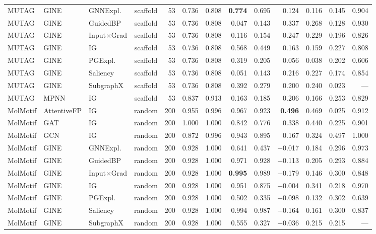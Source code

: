 \begin{table}[t]
{\begin{tabular}{lllcrrrrrrrrr}
MUTAG & GINE & GNNExpl. & scaffold & 53 & 0.736 & 0.808 & \textbf{0.774} & 0.695 & 0.124 & 0.116 & 0.145 & 0.904 \\
MUTAG & GINE & GuidedBP & scaffold & 53 & 0.736 & 0.808 & 0.047 & 0.143 & 0.337 & 0.268 & 0.128 & 0.930 \\
MUTAG & GINE & Input$\times$Grad & scaffold & 53 & 0.736 & 0.808 & 0.116 & 0.154 & 0.247 & 0.229 & 0.196 & 0.826 \\
MUTAG & GINE & IG & scaffold & 53 & 0.736 & 0.808 & 0.568 & 0.449 & 0.163 & 0.159 & 0.227 & 0.808 \\
MUTAG & GINE & PGExpl. & scaffold & 53 & 0.736 & 0.808 & 0.319 & 0.205 & 0.056 & 0.038 & 0.202 & 0.606 \\
MUTAG & GINE & Saliency & scaffold & 53 & 0.736 & 0.808 & 0.051 & 0.143 & 0.216 & 0.227 & 0.174 & 0.854 \\
MUTAG & GINE & SubgraphX & scaffold & 53 & 0.736 & 0.808 & 0.392 & 0.279 & 0.200 & 0.240 & 0.023 & --- \\
MUTAG & MPNN & IG & scaffold & 53 & 0.837 & 0.913 & 0.163 & 0.185 & 0.206 & 0.166 & 0.253 & 0.829 \\
\addlinespace[2pt]
MolMotif & AttentiveFP & IG & random & 200 & 0.955 & 0.996 & 0.967 & 0.923 & \textbf{0.496} & 0.469 & 0.025 & 0.912 \\
MolMotif & GAT & IG & random & 200 & 1.000 & 1.000 & 0.842 & 0.776 & 0.338 & 0.440 & 0.225 & 0.901 \\
MolMotif & GCN & IG & random & 200 & 0.872 & 0.996 & 0.943 & 0.895 & 0.167 & 0.324 & 0.497 & 1.000 \\
MolMotif & GINE & GNNExpl. & random & 200 & 0.928 & 1.000 & 0.641 & 0.437 & $-$0.017 & 0.184 & 0.296 & 0.973 \\
MolMotif & GINE & GuidedBP & random & 200 & 0.928 & 1.000 & 0.971 & 0.928 & $-$0.113 & 0.205 & 0.293 & 0.884 \\
MolMotif & GINE & Input$\times$Grad & random & 200 & 0.928 & 1.000 & \textbf{0.995} & 0.989 & $-$0.179 & 0.146 & 0.300 & 0.848 \\
MolMotif & GINE & IG & random & 200 & 0.928 & 1.000 & 0.951 & 0.875 & $-$0.004 & 0.341 & 0.218 & 0.970 \\
MolMotif & GINE & PGExpl. & random & 200 & 0.928 & 1.000 & 0.502 & 0.335 & $-$0.098 & 0.132 & 0.302 & 0.639 \\
MolMotif & GINE & Saliency & random & 200 & 0.928 & 1.000 & 0.994 & 0.987 & $-$0.164 & 0.161 & 0.300 & 0.837 \\
MolMotif & GINE & SubgraphX & random & 200 & 0.928 & 1.000 & 0.555 & 0.327 & $-$0.036 & 0.215 & 0.215 & --- \\

\end{tabular}}
\end{table}
